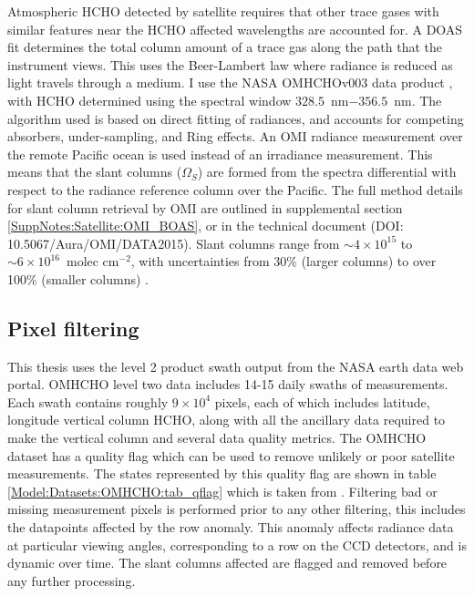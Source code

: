  Atmospheric HCHO detected by satellite requires that other trace gases with similar features near the HCHO affected wavelengths are accounted for.
  A DOAS fit determines the total column amount of a trace gas along the path that the instrument views.
  This uses the Beer-Lambert law where radiance is reduced as light travels through a medium.
  I use the NASA OMHCHOv003 data product \parencite{Abad2015}, with HCHO determined using the spectral window $328.5$~nm$ - 356.5$~nm. 
  The algorithm used is based on direct fitting of radiances, and accounts for competing absorbers, under-sampling, and Ring effects.
  An OMI radiance measurement over the remote Pacific ocean is used instead of an irradiance measurement.
  This means that the slant columns ($\Omega_S$) are formed from the spectra differential with respect to the radiance reference column over the Pacific.
  The full method details for slant column retrieval by OMI are outlined in supplemental section \ref{SuppNotes:Satellite:OMI_BOAS}, or in the technical document (DOI: 10.5067/Aura/OMI/DATA2015).
  Slant columns range from $\sim 4\times 10^{15} $ to $\sim 6 \times 10^{16}$~molec cm$^{-2}$, with uncertainties from 30\% (larger columns) to over 100\% (smaller columns) \parencite{Abad2015}.
  
  \subsection{Pixel filtering}
  \label{Model:omhcho:pixel_filtering}
  
  This thesis uses the level 2 product swath output from the NASA earth data web portal.
  OMHCHO level two data includes 14-15 daily swaths of measurements.
  Each swath contains roughly $9 \times 10^4$ pixels, each of which includes latitude, longitude vertical column HCHO, along with all the ancillary data required to make the vertical column and several data quality metrics.
  The OMHCHO dataset has a quality flag which can be used to remove unlikely or poor satellite measurements.
  The states represented by this quality flag are shown in table \ref{Model:Datasets:OMHCHO:tab_qflag} which is taken from \textcite{Kurosu2014}.
  Filtering bad or missing measurement pixels is performed prior to any other filtering, this includes the datapoints affected by the row anomaly.
  This anomaly \parencite{rowanomaly_url} affects radiance data at particular viewing angles, corresponding to a row on the CCD detectors, and is dynamic over time.
  The slant columns affected are flagged and removed before any further processing.
  
